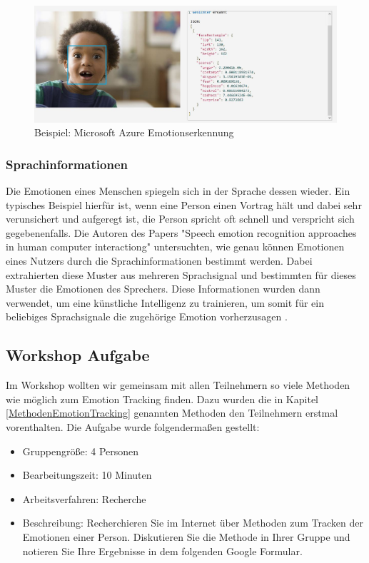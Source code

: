 \begin{figure}[!h]
	\centering
	\includegraphics[width=0.9\linewidth]{Pictures/Microsoft_Gestenerkennung}
	\caption[Beispiel: Microsoft Azure Emotionserkennung]{Beispiel: Microsoft Azure Emotionserkennung \cite{MicrosoftAzure}}
	\label{fig:microsoftgestenerkennung}
\end{figure}

\subsubsection{Sprachinformationen}
Die Emotionen eines Menschen spiegeln sich in der Sprache dessen wieder. Ein typisches Beispiel hierfür ist, wenn eine Person einen Vortrag hält und dabei sehr verunsichert und aufgeregt ist, die Person spricht oft schnell und verspricht sich gegebenenfalls. Die Autoren des Papers "Speech emotion recognition approaches in human computer interactiong" untersuchten, wie genau können Emotionen eines Nutzers durch die Sprachinformationen bestimmt werden. Dabei extrahierten diese Muster aus mehreren Sprachsignal und bestimmten für dieses Muster die Emotionen des Sprechers. Diese Informationen wurden dann verwendet, um eine künstliche Intelligenz zu trainieren, um somit für ein beliebiges Sprachsignale die zugehörige Emotion vorherzusagen \cite{SpeechInformation}.

\subsection{Workshop Aufgabe}
Im Workshop wollten wir gemeinsam mit allen Teilnehmern so viele Methoden wie möglich zum Emotion Tracking finden. Dazu wurden die in Kapitel \ref{MethodenEmotionTracking} genannten Methoden den Teilnehmern erstmal vorenthalten. Die Aufgabe wurde folgendermaßen gestellt:

\begin{itemize}
	\item Gruppengröße: 4 Personen
	\item Bearbeitungszeit: 10 Minuten
	\item Arbeitsverfahren: Recherche
	\item Beschreibung: Recherchieren Sie im Internet über Methoden zum Tracken der Emotionen einer Person. Diskutieren Sie die Methode in Ihrer Gruppe und notieren Sie Ihre Ergebnisse in dem folgenden Google Formular.
\end{itemize}


